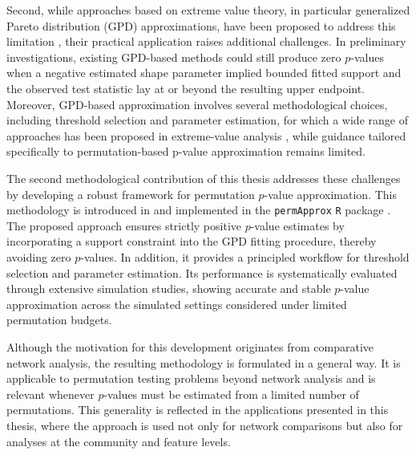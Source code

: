Second, while approaches based on extreme value theory, in particular generalized Pareto distribution (GPD) approximations, have been proposed to address this limitation \citep{knijnenburg2009fewer, winkler2016faster}, their practical application raises additional challenges. 
In preliminary investigations, existing GPD-based methods could still produce zero $p$-values when a negative estimated shape parameter implied bounded fitted support and the observed test statistic lay at or beyond the resulting upper endpoint.
Moreover, GPD-based approximation involves several methodological choices, including threshold selection and parameter estimation, for which a wide range of approaches has been proposed in extreme-value analysis \citep{scarrott2012review, langousis2016threshold, bader2018automated}, while guidance tailored specifically to permutation-based p-value approximation remains limited.

The second methodological contribution of this thesis addresses these challenges by developing a robust framework for permutation $p$-value approximation. 
This methodology is introduced in \citet{peschel2026permapprox} and implemented in the \texttt{permApprox} \texttt{R} package \citep{peschel2025permapprox}. 
The proposed approach ensures strictly positive $p$-value estimates by incorporating a support constraint into the GPD fitting procedure, thereby avoiding zero $p$-values. 
In addition, it provides a principled workflow for threshold selection and parameter estimation. 
Its performance is systematically evaluated through extensive simulation studies, showing accurate and stable $p$-value approximation across the simulated settings considered under limited permutation budgets.

Although the motivation for this development originates from comparative network analysis, the resulting methodology is formulated in a general way. 
It is applicable to permutation testing problems beyond network analysis and is relevant whenever $p$-values must be estimated from a limited number of permutations. 
This generality is reflected in the applications presented in this thesis, where the approach is used not only for network comparisons but also for analyses at the community and feature levels.

